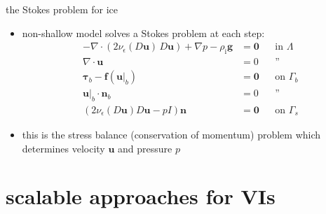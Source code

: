 \documentclass[svgnames,
               hyperref={colorlinks,citecolor=DeepPink4,linkcolor=FireBrick,urlcolor=Maroon},
               usepdftitle=false]  %
               {beamer}
\newcommand{\eps}{\epsilon}
\newcommand{\bbf}{\mathbf{f}}
\newcommand{\bn}{\mathbf{n}}
\newcommand{\bu}{\mathbf{u}}
\newcommand{\btau}{\bm{\tau}}
\newcommand{\bzero}{\bm{0}}
\newcommand{\rhoi}{\rho_{\text{i}}}
\begin{document}
\begin{frame}{the Stokes problem for ice}

\begin{itemize}
\item non-shallow model solves a Stokes problem at each step:
\begin{align*}
- \nabla \cdot \left(2 \nu_\eps(D\bu)\, D\bu\right) + \nabla p - \rhoi \mathbf{g} &= \bzero && \text{in $\Lambda$} \\
\nabla \cdot \bu &= 0 && \text{''} \\
\btau_b - \bbf(\bu|_b) &= \bzero && \text{on $\Gamma_b$} \\
\bu|_b \cdot \bn_b &= 0 && \text{''} \\
\left(2 \nu_\eps(D\bu) D\bu - pI\right) \bn &= \bzero && \text{on $\Gamma_s$}
\end{align*}
\item this is the \alert{stress balance} (conservation of momentum) problem which determines velocity $\bu$ and pressure $p$
\end{itemize}
\end{frame}


\section{scalable approaches for VIs}
\end{document}
